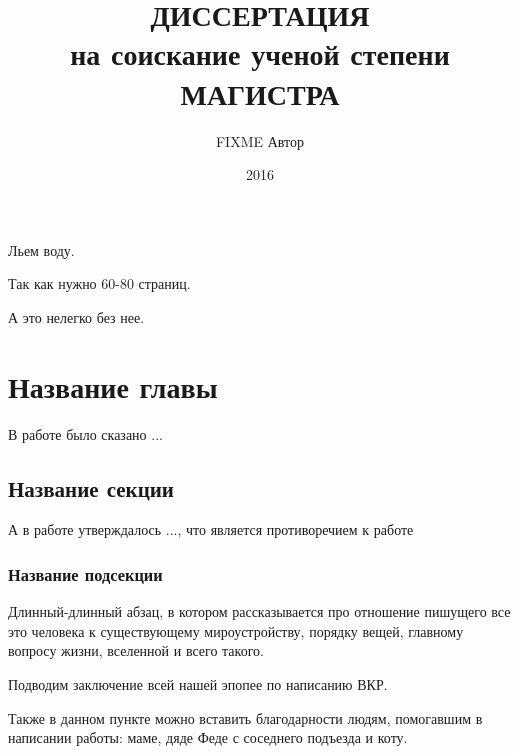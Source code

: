 \documentclass[14pt, master, substylefile = miee_master.rtx]{disser}
\begin{document}
\title{ДИССЕРТАЦИЯ\\[-14pt]на соискание ученой степени\\МАГИСТРА}

\author{FIXME Автор}

\date{2016}

\maketitle

\tableofcontents

\intro

Льем воду.

Так как нужно 60-80 страниц.

А это нелегко без нее.

\chapter{Название главы}

В работе \cite{ARIMA} было сказано ...

\section{Название секции}

А в работе \cite{Allen} утверждалось ..., что является противоречием к работе \cite{ARIMA}

\subsection{Название подсекции}

Длинный-длинный абзац, в котором рассказывается про отношение пишущего все это человека к существующему мироустройству, порядку вещей, главному вопросу жизни, вселенной и всего такого.




\conclusion

Подводим заключение всей нашей эпопее по написанию ВКР.

Также в данном пункте можно вставить благодарности людям, помогавшим в написании работы: маме, дяде Феде с соседнего подъезда и коту.



\end{document}
